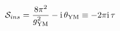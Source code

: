 \begin{equation}
{\cal S}_{ins} = \frac{8 \pi^2}{g_{\rm YM}^2} - {\rm i}\, \theta_{\rm
YM} \equiv - 2 \pi {\rm i} \, \tau
\end{equation}

